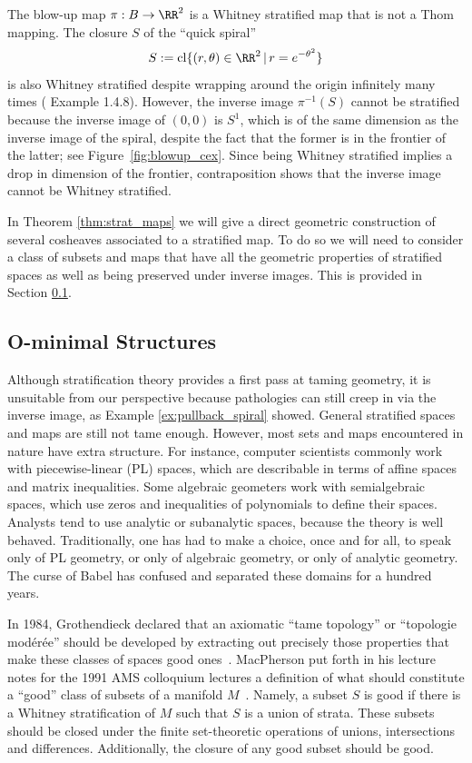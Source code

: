 \begin{ex}\label{ex:pullback_spiral}
	The blow-up map $\pi:B\to\RR^2$ is a Whitney stratified map that is not a Thom mapping. The closure $S$ of the ``quick spiral''
	\[
		S:=\mathrm{cl}\{(r,\theta)\in\RR^2 \,|\, r=e^{-\theta^2}\}
	\]
	is also Whitney stratified despite wrapping around the origin infinitely many times (\cite{pflaum} Example 1.4.8). However, the inverse image $\pi^{-1}(S)$ cannot be stratified because the inverse image of $(0,0)$ is $S^1$, which is of the same dimension as the inverse image of the spiral, despite the fact that the former is in the frontier of the latter; see Figure~\ref{fig:blowup_cex}. Since being Whitney stratified implies a drop in dimension of the frontier, contraposition shows that the inverse image cannot be Whitney stratified.
\end{ex}

In Theorem \ref{thm:strat_maps} we will give a direct geometric construction of several cosheaves associated to a stratified map. To do so we will need to consider a class of subsets and maps that have all the geometric properties of stratified spaces as well as being preserved under inverse images. This is provided in Section \ref{subsubsec:tame_topology}.

\subsection{O-minimal Structures}
\label{subsubsec:tame_topology}

Although stratification theory provides a first pass at taming geometry, it is unsuitable from our perspective because pathologies can still creep in via the inverse image, as Example \ref{ex:pullback_spiral} showed. General stratified spaces and maps are still not tame enough. However, most sets and maps encountered in nature have extra structure. For instance, computer scientists commonly work with piecewise-linear (PL) spaces, which are describable in terms of affine spaces and matrix inequalities. Some algebraic geometers work with semialgebraic spaces, which use zeros and inequalities of polynomials to define their spaces. Analysts tend to use analytic or subanalytic spaces, because the theory is well behaved. Traditionally, one has had to make a choice, once and for all, to speak only of PL geometry, or only of algebraic geometry, or only of analytic geometry. The curse of Babel has confused and separated these domains for a hundred years.

In 1984, Grothendieck declared that an axiomatic ``tame topology'' or ``topologie mod\'er\'ee'' should be developed by extracting out precisely those properties that make these classes of spaces good ones~\cite{grothendieck-sketch}. MacPherson put forth in his lecture notes for the 1991 AMS colloquium lectures a definition of what should constitute a ``good'' class of subsets of a manifold $M$~\cite{macpherson-ih-notes}. Namely, a subset $S$ is good if there is a Whitney stratification of $M$ such that $S$ is a union of strata. These subsets should be closed under the finite set-theoretic operations of unions, intersections and differences. Additionally, the closure of any good subset should be good.

